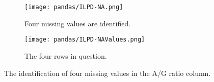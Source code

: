 \begin{figure}[H]
    \centering
    \begin{subfigure}{0.75\textwidth}
        \centering
       \texttt{[image: pandas/ILPD-NA.png]}
       \caption{Four missing values are identified.}
       \label{fig:NAs1} 
    \end{subfigure}
    
    \begin{subfigure}{1\textwidth}
        \centering
       \texttt{[image: pandas/ILPD-NAValues.png]}
       \caption{The four rows in question.}
       \label{fig:NAs2}
    \end{subfigure}
    \caption{The identification of four missing values in the A/G ratio column.}
\end{figure}



